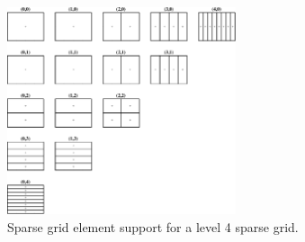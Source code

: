 \documentclass[preprint,11pt]{elsarticle}
\begin{document}
\begin{figure}
    \centering
    \includegraphics[width=0.6\textwidth]{FIGURES/asgard-element-grid.pdf}
    \caption{Sparse grid element support for a level 4 sparse grid.}
    \label{fig:sg-support}
\end{figure}
%
\end{document}
